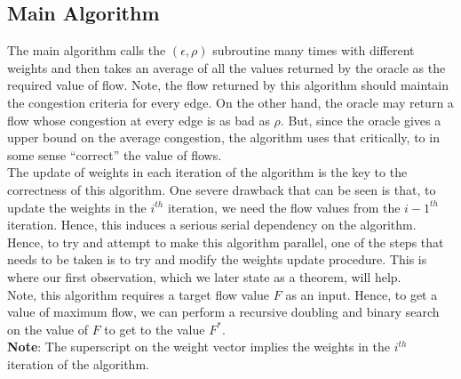 \documentclass[BTech]{iitmdiss}
\begin{document}
	  \subsection{Main Algorithm}
	      The main algorithm calls the $(\epsilon,\rho)$ subroutine many times with different weights and then takes an average of all the values
	      returned by the oracle as the required value of flow. Note, the flow returned by this algorithm should maintain the congestion criteria
	      for every edge. On the other hand, the oracle may return a flow whose congestion at every edge is as bad as $\rho$. But, since
	      the oracle gives a upper bound on the average congestion, the algorithm uses that critically, to in some sense ``correct'' the value of 
	      flows. \\
	      
	      The update of weights in each iteration of the algorithm is the key to the correctness of this algorithm. One severe drawback that can 
	      be seen is that, to update the weights in the $i^{th}$ iteration, we need the flow values from the $i-1^{th}$ iteration. Hence, this 
	      induces a serious serial dependency on the algorithm. Hence, to try and attempt to make this algorithm parallel, one of the steps that 
	      needs to be taken is to try and modify the weights update procedure. This is where our first observation, which we later state as a theorem,
	      will help.\\
	      
	      Note, this algorithm requires a target flow value $F$ as an input. Hence, to get a value of maximum flow, we can perform a recursive
	      doubling and binary search on the value of $F$ to get to the value $F^{\ast}$. \\
	      
	      
	      \textbf{Note}: The superscript on the weight vector implies the weights in the $i^{th}$ iteration of the algorithm. \\
	      
\end{document}
